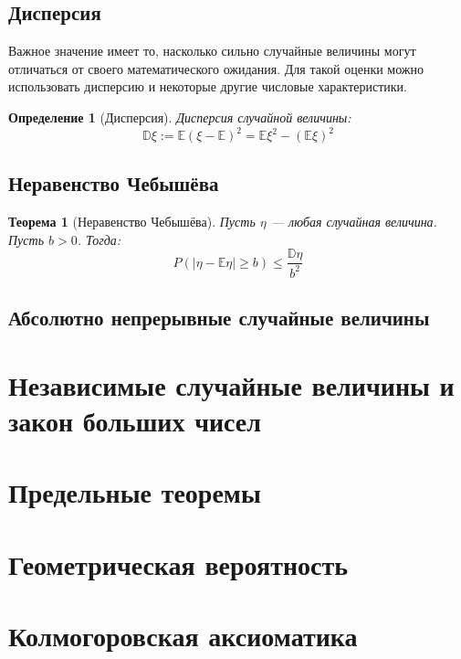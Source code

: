 \documentclass{article}
\theoremstyle{mydef}
\newtheorem{definition}{Определение}
\theoremstyle{myth}
\newtheorem{theorem}{Теорема}
\begin{document}
\subsection{Дисперсия}

Важное значение имеет то, насколько сильно случайные величины могут отличаться от своего математического ожидания. Для такой оценки можно использовать дисперсию и некоторые другие числовые характеристики.

\begin{definition}[Дисперсия]
    Дисперсия случайной величины:
    \begin{equation}
        \mathbb{D} \xi := \mathbb{E}(\xi - \mathbb{E})^2 = \mathbb{E} \xi^2 - (\mathbb{E}\xi)^2
    \end{equation}
\end{definition}

\subsection{Неравенство Чебышёва}

\begin{theorem}[Неравенство Чебышёва]
    Пусть $\eta$ --- любая случайная величина. Пусть $b>0$. Тогда:
    \begin{equation}
        P(|\eta - \mathbb{E} \eta| \geq b) \leq \frac{\mathbb{D}\eta}{b^2}    
    \end{equation}
\end{theorem}

\subsection{Абсолютно непрерывные случайные величины}

\section{Независимые случайные величины и закон больших чисел}

\section{Предельные теоремы}

\section{Геометрическая вероятность}

\section{Колмогоровская аксиоматика}
\end{document}
